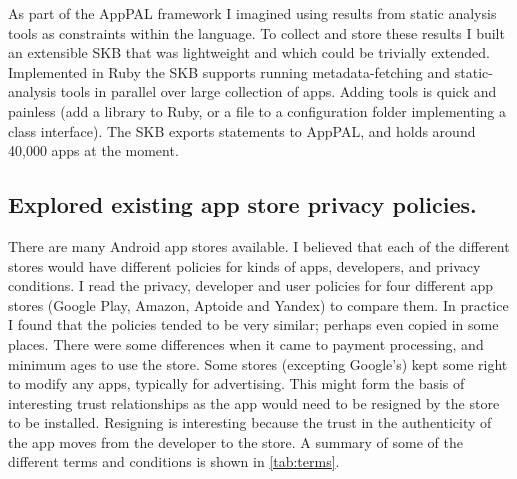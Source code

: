 \documentclass[a4paper]{scrartcl}
\begin{document}
As part of the AppPAL framework I imagined using results from static analysis tools as constraints within the language.
To collect and store these results I built an extensible \ac{SKB} that was lightweight and which could be trivially extended.
Implemented in Ruby the \ac{SKB} supports running metadata-fetching and static-analysis tools in parallel over large collection of apps.
Adding tools is quick and painless (add a library to Ruby, or a file to a configuration folder implementing a class interface).
The \ac{SKB} exports statements to AppPAL, and holds around 40,000 apps at the moment.

\subsection{Explored existing app store privacy policies.}

There are many Android app stores available.
I believed that each of the different stores would have different policies for kinds of apps, developers, and privacy conditions.
I read the privacy, developer and user policies for four different app stores (Google Play, Amazon, Aptoide and Yandex) to compare them.
In practice I found that the policies tended to be very similar; perhaps even copied in some places.
There were some differences when it came to payment processing, and minimum ages to use the store.
Some stores (excepting Google's) kept some right to modify any apps, typically for advertising.
This might form the basis of interesting trust relationships as the app would need to be resigned by the store to be installed.
Resigning is interesting because the trust in the authenticity of the app moves from the developer to the store.
A summary of some of the different terms and conditions is shown in \autoref{tab:terms}.
\end{document}
